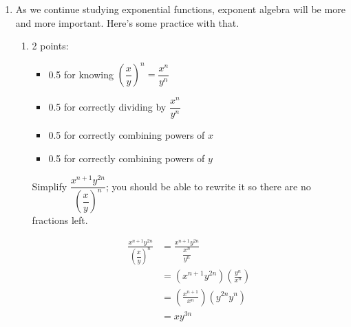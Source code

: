 \documentclass{article}
\begin{document}
\begin{enumerate}
\begin{enumerate}
    \begin{solution}
      $6$ days is $144$ hours, so Lallemand will have
      $0.00005(2)^{144/4}$ pounds of yeast, or approximately $3.44$ million
      pounds of yeast.
    \end{solution}


  \end{enumerate}

  \pspace{\newpage}

\item As we continue studying exponential functions, exponent algebra will be more and more important. Here's some practice with that.

  \begin{enumerate}

  \item

    \begin{grading}
      2 points:
      \begin{itemize}[nosep]
      \item 0.5 for knowing $\left( \dfrac{x}{y} \right)^n = \dfrac{x^n}{y^n}$
      \item 0.5 for correctly dividing by $\dfrac{x^n}{y^n}$
      \item 0.5 for correctly combining powers of $x$
      \item 0.5 for correctly combining powers of $y$
      \end{itemize}
    \end{grading}

    \begin{problem}[\stretch{1.5}]
      Simplify 
      $\dfrac{x^{n+1}y^{2n}}{\left(\dfrac{x}{y}\right)^n}$; you should be able to rewrite it so there are no fractions left. 
    \end{problem}

    \begin{solution}
      \begin{align*}
        \frac{x^{n+1}y^{2n}}{\left(\dfrac{x}{y}\right)^n} &=
        \frac{x^{n+1}y^{2n}}{\dfrac{x^n}{y^n}} \\
        &= (x^{n+1}y^{2n}) \left(\frac{y^n}{x^n}\right) \\
        &= \left(\frac{x^{n+1}}{x^n}\right) (y^{2n}y^n) \\
        &= x y^{3n}
      \end{align*}
    \end{solution}


\end{enumerate}
\end{enumerate}
\end{document}

